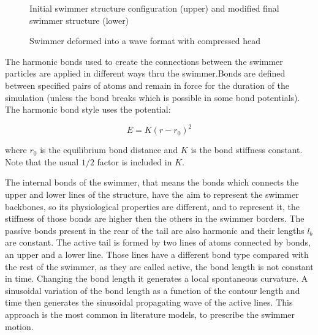 \begin{figure}[ht]
\centering
  \begin{footnotesize}
  
  \caption[Initial swimmer structure configuration (upper) and modified final swimmer structure (lower)]{Initial swimmer structure configuration (upper) and modified final swimmer structure (lower)}
  \label{fig:Bild2.5}
  \end{footnotesize}
\end{figure} 

\begin{figure}[ht]
\centering
  \begin{footnotesize} 
  
  \caption[Swimmer deformed into a wave format with compressed head]{Swimmer deformed into a wave format with compressed head}
  \label{fig:Bild4}
  \end{footnotesize}
\end{figure} 

The harmonic bonds used to create the connections between the swimmer particles are applied in different ways thru the swimmer.Bonds are defined between specified pairs of 
atoms and remain in force for the duration of the simulation (unless the bond breaks which is possible in some bond potentials). The harmonic bond style uses the potential:


\begin{equation} 
  E = K ( r - r_{0})^2
\end{equation}

where $r_{0}$ is the equilibrium bond distance and $K$ is the bond stiffness constant. Note that the usual $1/2$ factor is included in $K$.

The internal bonds of the swimmer, that means the bonds which connects the upper and lower lines of the structure, have the aim to represent the swimmer backbones, so its 
physiological properties are different, and to represent it, the stiffness of those bonds are higher then the others in the swimmer borders. The passive bonds present in the 
rear of the tail are also harmonic and their lengths $l_{b}$ are constant. The active tail is formed by two lines of atoms connected by bonds, an upper and a lower line. Those
lines have a different bond type compared with the rest of the swimmer, as they are called active, the bond length is not constant in time. Changing the bond length it generates
a local spontaneous curvature. A sinusoidal variation of the bond length as a function of the contour length and time then generates the sinusoidal propagating wave of the active
lines. This approach is the most common in literature models, to prescribe the swimmer motion.\par

